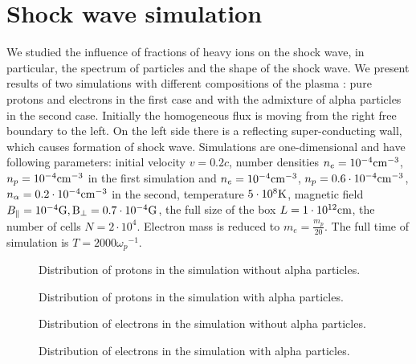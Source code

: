 \section{Shock wave simulation}
We studied the influence of fractions of heavy ions on the shock wave, in particular, the spectrum of particles and the shape of the shock wave. We present results of two simulations with different compositions of the plasma : pure protons and electrons in the first case and with the admixture of alpha particles in the second case. Initially the homogeneous flux is  moving from the right free boundary to the left. On the left side there is a reflecting super-conducting wall, which causes formation of shock wave. Simulations are one-dimensional and have following parameters: initial velocity $v = 0.2c$, number densities $n_e = 10^{-4} \rm{cm}^{-3}$, $n_p = 10^{-4} \rm{cm}^{-3}$ in the first simulation and $n_e = 10^{-4} \rm{cm}^{-3}$, $n_p = 0.6\cdot10^{-4} \rm{cm}^{-3}$, $n_\alpha = 0.2\cdot10^{-4} \rm{cm}^{-3}$ in the second, temperature $5\cdot10^8 \rm{K}$, magnetic field $B_\parallel = 10^{-4} \rm{G}, B_\perp= 0.7\cdot10^{-4} \rm{G}$, the full size of the box $L = 1\cdot10^{12} \rm{cm}$, the number of cells $N=2\cdot10^4$. Electron mass is reduced to $m_e = \frac{m_p}{20}$. The full time of simulation is $T = 2000 {\omega_p}^{-1}$.
\begin{figure}[h!]
	\centering
	\begin{minipage}{0.49\textwidth}
		\centering
		\caption{Distribution of protons in the simulation without alpha particles.}
		\label{protons}
	\end{minipage}\hfill
	\begin{minipage}{0.49\textwidth}
		\centering
		\caption{Distribution of protons in the simulation with alpha particles.}
		\label{protons_with_alpha}
	\end{minipage}
\end{figure}
\begin{figure}[h!]
	\centering
	\begin{minipage}{0.49\textwidth}
		\centering
		\caption{Distribution of electrons in the simulation without alpha particles.}
		\label{electrons}
	\end{minipage}\hfill
	\begin{minipage}{0.49\textwidth}
		\centering
		\caption{Distribution of electrons in the simulation with alpha particles.}
		\label{electrons_with_alpha}
	\end{minipage}
\end{figure}


